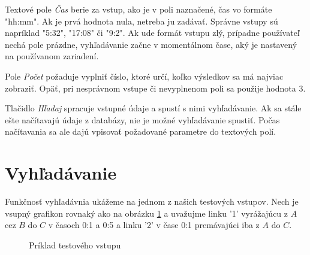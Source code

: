 Textové pole \textit{Čas} berie za vstup, ako je v poli naznačené, čas vo formáte "hh:mm". Ak je prvá hodnota nula, netreba ju zadávať. Správne vstupy sú napríklad "5:32", "17:08" či "9:2". Ak ude formát vstupu zlý, prípadne používateľ nechá pole prázdne, vyhľadávanie začne v momentálnom čase, aký je nastavený na používanom zariadení.\newline

Pole \textit{Počet} požaduje vyplniť číslo, ktoré určí, koľko výsledkov sa má najviac zobraziť. Opäť, pri nesprávnom vstupe či nevyplnenom poli sa použije hodnota $3$.\newline

Tlačidlo \textit{Hľadaj} spracuje vstupné údaje a spustí s nimi vyhľadávanie. Ak sa stále ešte načítavajú údaje z databázy, nie je možné vyhľadávanie spustiť. Počas načítavania sa ale dajú vpisovať požadované parametre do textových polí.\newline


\section{Vyhľadávanie}

Funkčnosť vyhľadávnia ukážeme na jednom z našich testových vstupov. Nech je vsupný grafikon rovnaký ako na obrázku \ref{priklad_vstupu_softver} a uvažujme linku '1' vyrážajúcu z $A$ cez $B$ do $C$ v časoch 0:1 a 0:5 a linku '2' v čase 0:1 premávajúci iba z $A$ do $C$.\newline

\begin{figure}[H]
  \caption{Príklad testového vstupu}
  \label{priklad_vstupu_softver}
\end{figure}

